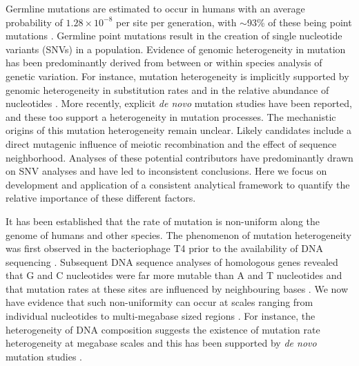 Germline mutations are estimated to occur in humans with an average probability of $1.28\times10^{-8}$ per site per generation, with $\sim$93\% of these being point mutations \citep{Roach_2010, Jnsson_Parental_2017}. Germline point mutations result in the creation of single nucleotide variants (SNVs) in a population.  Evidence of genomic heterogeneity in mutation has been predominantly derived from between or within species analysis of genetic variation. For instance, mutation heterogeneity is implicitly supported by genomic heterogeneity in substitution rates \citep{Hodgkinson2009,ying2010evidence} and in the relative abundance of nucleotides \citep{cuny1981major}.  More recently, explicit \textit{de novo} mutation studies \citep[e.g.][]{michaelson2012whole, francioli2015genome, smith2018large} have been reported, and these too support a heterogeneity in mutation processes.  The mechanistic origins of this mutation heterogeneity remain unclear.  Likely candidates include a direct mutagenic influence of meiotic recombination and the effect of sequence neighborhood.  Analyses of these potential contributors have predominantly drawn on SNV analyses and have led to inconsistent conclusions. Here we focus on development and application of a consistent analytical framework to quantify the relative importance of these different factors.

It has been established that the rate of mutation is non-uniform along the genome of humans and other species. The phenomenon of mutation heterogeneity was first observed in the bacteriophage T4 prior to the availability of DNA sequencing \citep{benzer1961topography}. Subsequent DNA sequence analyses of homologous genes revealed that G and C nucleotides were far more mutable than A and T nucleotides \citep{Coulondre_1978, gojobori1982patterns} and that mutation rates at these sites are influenced by neighbouring bases \citep{bulmer1986neighboring}. We now have evidence that such non-uniformity can occur at scales ranging from individual nucleotides to multi-megabase sized regions \citep{Hodgkinson_2011}. For instance, the heterogeneity of DNA composition suggests the existence of mutation rate heterogeneity at megabase scales and this has been supported by \textit{de novo} mutation studies \citep{smith2018large}.

